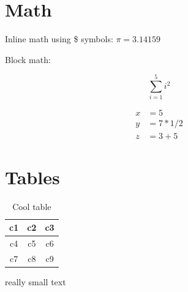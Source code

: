 \documentclass[10pt, letterpaper]{article}  %
\begin{document}
\section{Math}

Inline math using \$ symbols: $\pi = 3.14159$

Block math:

\[
    \sum^{5}_{i=1} i^2
\]

\begin{align*}
    x &= 5 \\
    y &= 7 * 1 / 2 \\
    z &= 3 + 5
\end{align*}


\vspace{3in}
\section{Tables}

\begin{table}[h!]
\centering
\begin{tabular}{|c|c|c|}
    \hline
    c1 & c2 & c3 \\
    \hline
    c4 & c5 & c6 \\
    c7 & c8 & c9 \\
    \hline
\end{tabular}

\vspace{-0.3cm}
\caption{Cool table}
\end{table}

\begin{small}
    really small text
\end{small}


\end{document}
